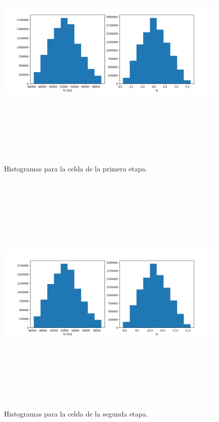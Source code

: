 \begin{figure}[H] %
	\centering	\includegraphics[width=12cm,height=12cm,keepaspectratio]{../EJ4/graficos/histo_c1.png}
	\caption{Histogramas para la celda de la primera etapa.}
	\label{histo_c1}
\end{figure}

\begin{figure}[H] %
	\centering	\includegraphics[width=12cm,height=12cm,keepaspectratio]{../EJ4/graficos/histo_c2.png}
	\caption{Histogramas para la celda de la segunda etapa.}
	\label{histo_c2}
\end{figure}

